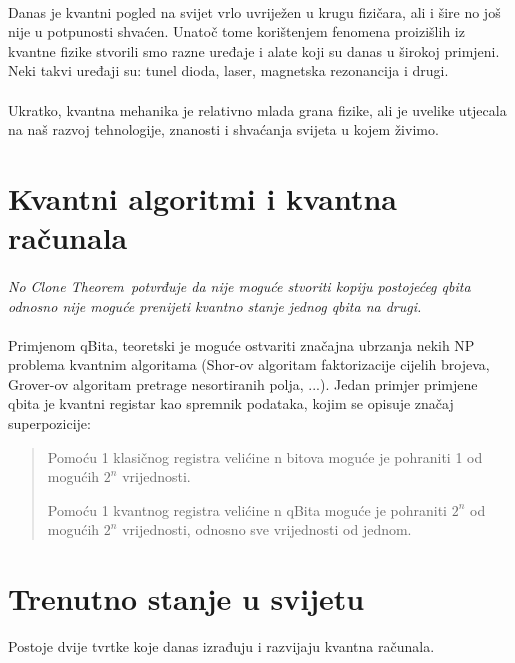 \documentclass[times, utf8, zavrsni]{fer}
\begin{document}
\paragraph{}
Danas je kvantni pogled na svijet vrlo uvriježen u krugu fizičara, ali i šire no još nije u potpunosti shvaćen. Unatoč tome korištenjem fenomena proizišlih iz kvantne fizike stvorili smo razne uređaje i alate koji su danas u širokoj primjeni. Neki takvi uređaji su: tunel dioda, laser, magnetska rezonancija i drugi.

\paragraph{}
Ukratko, kvantna mehanika je relativno mlada grana fizike, ali je uvelike utjecala na naš razvoj tehnologije, znanosti i shvaćanja svijeta u kojem živimo.

\section{Kvantni algoritmi i kvantna računala}

\paragraph{}
\it No Clone Theorem\rm\ potvrđuje da nije moguće stvoriti kopiju postojećeg qbita odnosno nije moguće prenijeti kvantno stanje jednog qbita na drugi.

\paragraph{}
Primjenom qBita, teoretski je moguće ostvariti značajna ubrzanja nekih NP problema kvantnim algoritama (Shor-ov algoritam faktorizacije cijelih brojeva, Grover-ov algoritam pretrage nesortiranih polja, ...).
Jedan primjer primjene qbita je kvantni registar kao spremnik podataka, kojim se opisuje značaj superpozicije:
\begin{quote}
Pomoću 1 klasičnog registra velićine n bitova moguće je pohraniti 1 od mogućih $2^n$ vrijednosti.

Pomoću 1 kvantnog registra velićine n qBita moguće je pohraniti $2^n$ od mogućih $2^n$ vrijednosti, odnosno sve vrijednosti od jednom.
\end{quote}

\section{Trenutno stanje u svijetu}
Postoje dvije tvrtke koje danas izrađuju i razvijaju kvantna računala.
\end{document}

